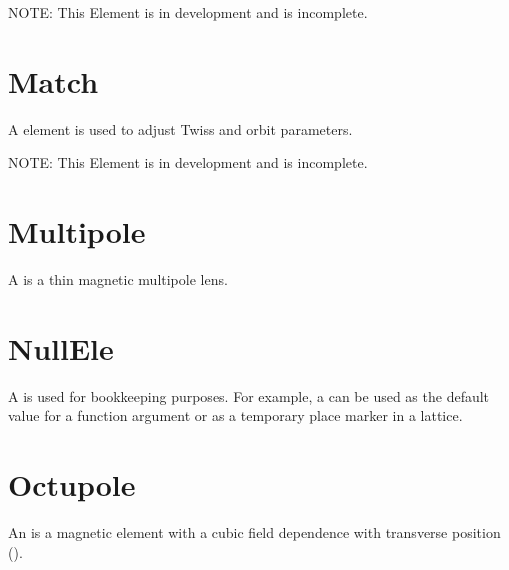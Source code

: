 NOTE: This Element is in development and is incomplete.

\section{Match}
\label{s:match}

A  element is used to adjust Twiss and orbit parameters.

NOTE: This Element is in development and is incomplete.

\section{Multipole}
\label{s:mult}

A  is a thin magnetic multipole lens.

\section{NullEle}
\label{s:nullele}

A  is used for bookkeeping purposes. For example, a  can be used as
the default value for a function argument or as a temporary place marker in a lattice.

\section{Octupole}
\label{s:octupole}

An  is a magnetic element with a cubic field dependence
with transverse position ().


